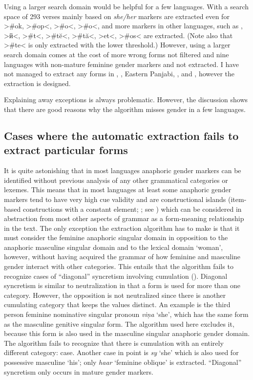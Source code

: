 \documentclass[output=collectionpaper]{langsci/langscibook}
\begin{document}
Using a larger search domain would be helpful for a few languages. With a search space of 293 verses mainly based on  \textit{she/her} markers are extracted even for  >\#ok, >\#op<,  >\#o<,  >\#o<, and more markers in other languages, such as , >й<,  >\#t<,  >\#tĕ<, >\#tă<,  >et<,  >\#os< are extracted. (Note also that  >\#te< is only extracted with the lower threshold.) However, using a larger search domain comes at the cost of more wrong forms not filtered and nine languages with non-mature feminine gender markers and  not extracted. I have not managed to extract any forms in , , Eastern Panjabi, , and , however the extraction is designed.

Explaining away exceptions is always problematic. However, the discussion shows that there are good reasons why the algorithm misses gender in a few languages.

\subsection{Cases where the automatic extraction fails to extract particular forms}
\label{sec:BW:3.6}

It is quite astonishing that in most languages anaphoric gender markers can be identified without previous analysis of any other grammatical categories or lexemes. This means that in most languages at least some anaphoric gender markers tend to have very high cue validity and are constructional islands (item-based constructions with a constant element; \citealt{Tomasello2003}; see ) which can be considered in abstraction from most other aspects of grammar as a form-meaning relationship in the text. The only exception the extraction algorithm has to make is that it must consider the feminine anaphoric singular domain in opposition to the anaphoric masculine singular domain and to the lexical domain ‘woman’, however, without having acquired the grammar of how feminine and masculine gender interact with other categories. This entails that the algorithm fails to recognize cases of “diagonal” syncretism involving cumulation (). Diagonal syncretism is similar to neutralization in that a form is used for more than one category. However, the opposition is not neutralized since there is another cumulating category that keeps the values distinct. An example is the  third person feminine nominative singular pronoun \textit{viņa} ‘she’, which has the same form as the masculine genitive singular form. The algorithm used here excludes it, because this form is also used in the masculine singular anaphoric gender domain. The algorithm fails to recognize that there is cumulation with an entirely different category: case. Another case in point is  \textit{sy} ‘she’ which is also used for possessive masculine ‘his’; only \textit{haar} ‘feminine oblique’ is extracted. “Diagonal” syncretism only occurs in mature gender markers.
\end{document}

